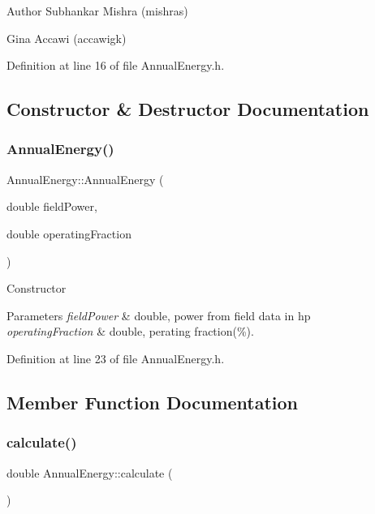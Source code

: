 \begin{DoxyAuthor}{Author}
Subhankar Mishra (mishras) 

Gina Accawi (accawigk) 
\end{DoxyAuthor}


Definition at line 16 of file Annual\+Energy.\+h.



\subsection{Constructor \& Destructor Documentation}
\mbox{\label{class_annual_energy_a5e446ce85879bafeac8fc992cb5b9ed7}} 
\subsubsection{\texorpdfstring{Annual\+Energy()}{AnnualEnergy()}}
{\footnotesize\ttfamily Annual\+Energy\+::\+Annual\+Energy (\begin{DoxyParamCaption}\item[{double}]{field\+Power,  }\item[{double}]{operating\+Fraction }\end{DoxyParamCaption})\hspace{0.3cm}{\ttfamily [inline]}}

Constructor 
\begin{DoxyParams}{Parameters}
{\em field\+Power} & double, power from field data in hp \\
\hline
{\em operating\+Fraction} & double, perating fraction(\%). \\
\hline
\end{DoxyParams}


Definition at line 23 of file Annual\+Energy.\+h.



\subsection{Member Function Documentation}
\mbox{\label{class_annual_energy_ab599860ffb32ce20a1042a3e9d2ad57f}} 
\subsubsection{\texorpdfstring{calculate()}{calculate()}}
{\footnotesize\ttfamily double Annual\+Energy\+::calculate (\begin{DoxyParamCaption}{ }\end{DoxyParamCaption})}



